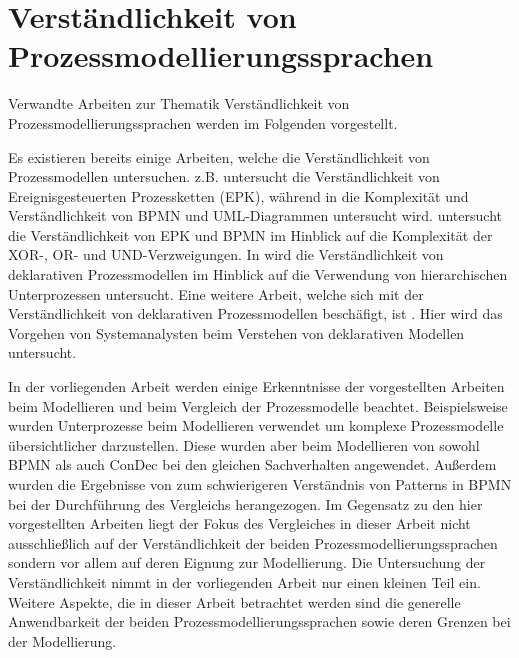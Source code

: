 \section{Verständlichkeit von Prozessmodellierungssprachen}

Verwandte Arbeiten zur Thematik Verständlichkeit von Prozessmodellierungssprachen werden im Folgenden vorgestellt.

Es existieren bereits einige Arbeiten, welche die Verständlichkeit von Prozessmodellen untersuchen. \cite{bpm07} z.B. untersucht die Verständlichkeit von Ereignisgesteuerten Prozessketten (EPK), während in \cite{gruhn2006complexity} die Komplexität und Verständlichkeit von BPMN und UML-Diagrammen untersucht wird. \cite{reijers2011study} untersucht die Verständlichkeit von EPK und BPMN im Hinblick auf die Komplexität der XOR-, OR- und UND-Verzweigungen. \newline
In \cite{sabrina942} wird die Verständlichkeit von deklarativen Prozessmodellen im Hinblick auf die Verwendung von hierarchischen Unterprozessen untersucht. Eine weitere Arbeit, welche sich mit der Verständlichkeit von deklarativen Prozessmodellen beschäfigt, ist \cite{haisjackl2014understanding}. Hier wird das Vorgehen von Systemanalysten beim Verstehen von deklarativen Modellen untersucht.\newline

In der vorliegenden Arbeit werden einige Erkenntnisse der vorgestellten Arbeiten beim Modellieren und beim Vergleich der Prozessmodelle beachtet. Beispielsweise wurden Unterprozesse beim  Modellieren verwendet um komplexe Prozessmodelle übersichtlicher darzustellen. Diese wurden  aber beim Modellieren von sowohl BPMN als auch ConDec bei den gleichen Sachverhalten angewendet.\newline
Außerdem wurden die Ergebnisse von \cite{haisjackl2014understanding} zum schwierigeren Verständnis von Patterns in BPMN bei der Durchführung des Vergleichs herangezogen.\newline
Im Gegensatz zu den hier vorgestellten Arbeiten liegt der Fokus des Vergleiches in dieser Arbeit nicht ausschließlich auf der Verständlichkeit der beiden Prozessmodellierungssprachen sondern vor allem auf deren Eignung zur Modellierung. Die Untersuchung der Verständlichkeit nimmt in der vorliegenden Arbeit nur einen kleinen Teil ein. Weitere Aspekte, die in dieser Arbeit betrachtet werden sind die generelle Anwendbarkeit der beiden Prozessmodellierungssprachen sowie deren Grenzen bei der Modellierung. \newline


